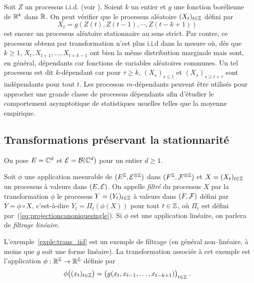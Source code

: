\begin{example}
\label{exple:trans_iid}
Soit $Z$ un processus i.i.d. (voir ).
Soient $k$ un entier et $g$ une fonction bor\'elienne de $\mathbb{R}^k$
dans $\mathbb{R}$. On peut v\'erifier que le processus al\'eatoire
$(X_t)_{t\in\mathbb{Z}}$ d\'efini par
\[
 X_t= g(Z(t), Z(t-1), \cdots, Z(t-k+1))
\]
est encore un processus al\'eatoire stationnaire au sens strict.  Par contre, ce
processus obtenu par transformation n'est plus i.i.d dans la mesure o\`u, d\`es que
$k \geq 1$, $X_t, X_{t+1}, \dots, X_{t+k-1}$ ont bien la m\^{e}me distribution
marginale mais sont, en g\'en\'eral, d\'ependants car fonctions de variables
al\'eatoires communes. Un tel processus est dit $k$-d\'ependant car pour $\tau \geq k$,
$(X_s)_{s\leq t}$ et $(X_s)_{s\geq t+\tau}$ sont ind\'ependants pour tout $t$. Les processus $m$-d\'ependants
peuvent \^{e}tre utilis\'es pour approcher une grande classe de processus d\'ependants
afin d'\'etudier le comportement asymptotique de statistiques usuelles telles que
la moyenne empirique.  
\end{example}


\subsection{Transformations pr\'eservant la stationnarit\'e}

On pose $E=\mathbb{C}^d$ et $\mathcal{E}=\mathcal{B}(\mathbb{C}^d)$ pour un entier
$d\geq1$.




\begin{definition}[Filtrage]
  Soit $\phi$ une application mesurable de $(E^{\mathbb{Z}},\mathcal{E}^{\otimes \mathbb{Z}})$
  dans $(F^{\mathbb{Z}},\mathcal{F}^{\otimes \mathbb{Z}})$ et $X=(X_t)_{t\in \mathbb{Z}}$ un processus \`a valeurs dans $(E,\mathcal{E})$.
  On appelle \emph{filtr\'e} du processus $X$ par la transformation $\phi$ le
  processus $Y=(Y_t)_{t\in \mathbb{Z}}$ \`a valeurs dans $(F,\mathcal{F})$ d\'efini par
  $Y=\phi\circ X$, c'est-\`a-dire $Y_t=\Pi_t(\phi( X))$ pour tout $t\in
  \mathbb{Z}$, o\`u $\Pi_t$ est d\'efini par~(\ref{eq:projectioncanoniquesingle}). Si
  $\phi$ est une application lin\'eaire, on parlera de \emph{filtrage lin\'eaire}.
\end{definition}

L'exemple~\ref{exple:trans_iid} est un exemple de filtrage (en g\'en\'eral
non--lin\'eaire, \`a moins que $g$ soit une forme lin\'eaire).  La transformation
associ\'ee \`a cet exemple est l'application $\phi:\mathbb{R}^{\mathbb{Z}}\to\mathbb{R}^{\mathbb{Z}}$
d\'efinie par
$$
\phi\big((x_t)_{t\in\mathbb{Z}}\big)=
\big(g(x_t,x_{t-1},\dots,x_{t-k+1})\big)_{t\in\mathbb{Z}}\;.
$$


